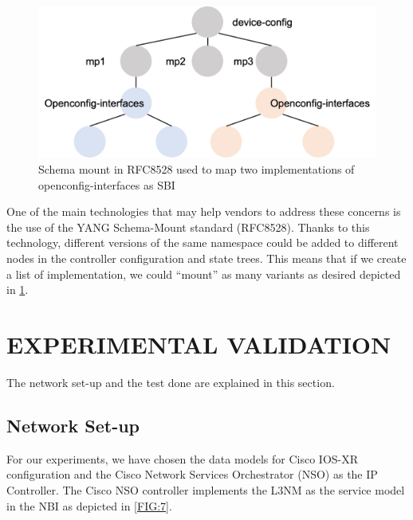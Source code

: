 \documentclass[conference]{IEEEtran}
\begin{document}
\begin{figure}
	\centering
		\includegraphics[width=\linewidth]{figure31.png}
	\caption{Schema mount in RFC8528 used to map two implementations of openconfig-interfaces as SBI}
	\label{FIG:3}
\end{figure}

One of the main technologies that may help vendors to address these concerns is the use of the YANG Schema-Mount standard (RFC8528). Thanks to this technology, different versions of the same namespace could be added to different nodes in the controller configuration and state trees. This means that if we create a list of implementation, we could “mount” as many variants as desired depicted in \cref{FIG:3}.


\section{EXPERIMENTAL VALIDATION}
\label{sect:exp}
The network set-up and the test done are explained in this section.

\subsection{Network Set-up}

For our experiments, we have chosen the data models for Cisco IOS-XR configuration and the Cisco Network Services Orchestrator (NSO) as the IP Controller. The Cisco NSO controller implements the L3NM as the service model in the NBI as depicted in \cref{FIG:7}.
\end{document}
